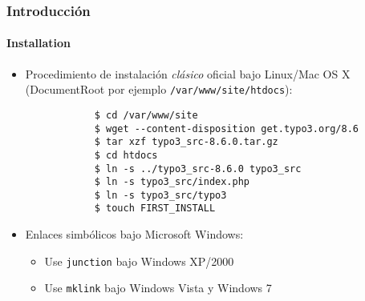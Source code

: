 \begin{frame}[fragile]
	\frametitle{Introducción}
	\framesubtitle{Installation}

	\begin{itemize}
		\item Procedimiento de instalación \textit{clásico} oficial bajo Linux/Mac OS X\newline
			(DocumentRoot por ejemplo \texttt{/var/www/site/htdocs}):
		\begin{lstlisting}
			$ cd /var/www/site
			$ wget --content-disposition get.typo3.org/8.6
			$ tar xzf typo3_src-8.6.0.tar.gz
			$ cd htdocs
			$ ln -s ../typo3_src-8.6.0 typo3_src
			$ ln -s typo3_src/index.php
			$ ln -s typo3_src/typo3
			$ touch FIRST_INSTALL
		\end{lstlisting}

		\item Enlaces simbólicos bajo Microsoft Windows:

			\begin{itemize}
				\item Use \texttt{junction} bajo Windows XP/2000
				\item Use \texttt{mklink} bajo Windows Vista y Windows 7
			\end{itemize}

	\end{itemize}
\end{frame}

